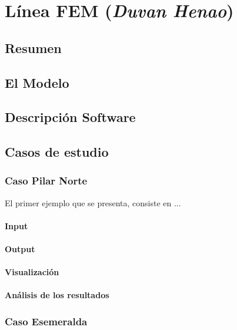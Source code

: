 
\chapter{L\'inea FEM (\textit{Duvan Henao}) }

\section{Resumen}

\section{El Modelo}

\section{Descripci\'on Software}


\section{Casos de estudio}

\subsection{Caso Pilar Norte}


El primer ejemplo que se presenta, consiste en ...


\subsubsection{Input}

\subsubsection{Output}

\subsubsection{Visualizaci\'on}

\subsubsection{An\'alisis de los resultados}

\subsection{Caso Esemeralda}


